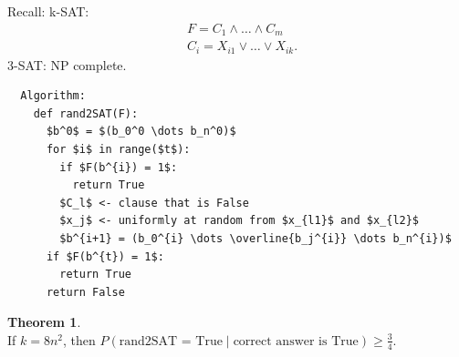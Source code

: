 \documentclass[a4paper, 12pt]{book}
\theoremstyle{definition}
\newtheorem{theorem}[counter]{Theorem}
\theoremstyle{remark}
\begin{document}
Recall: k-SAT:
\begin{align*}
  &F = C_1 \land \dots \land C_m \\
  &C_i = X_{i1} \lor \dots \lor X_{ik}.
\end{align*}
3-SAT: NP complete.
\begin{lstlisting}
  Algorithm:
    def rand2SAT(F):
      $b^0$ = $(b_0^0 \dots b_n^0)$
      for $i$ in range($t$):
        if $F(b^{i}) = 1$:
          return True
        $C_l$ <- clause that is False
        $x_j$ <- uniformly at random from $x_{l1}$ and $x_{l2}$
        $b^{i+1} = (b_0^{i} \dots \overline{b_j^{i}} \dots b_n^{i})$
      if $F(b^{t}) = 1$:
        return True
      return False
\end{lstlisting}
\begin{theorem} \text{} \\
  If $k = 8n^2$, then $P(\text{rand2SAT = True} \mid \text{correct answer is True}) \geq \frac{3}{4}$.
\end{theorem}
\end{document}
